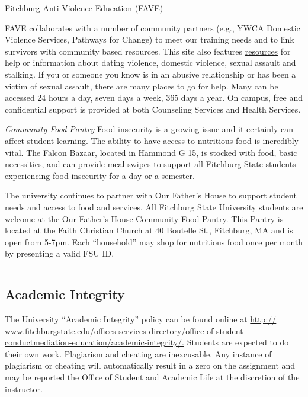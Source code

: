 \documentclass[
  letterpaper,
  DIV=11,
  numbers=noendperiod]{scrartcl}
\begin{document}
\href{http://www.google.com/url?q=http\%3A\%2F\%2Fwww.fitchburgstate.edu\%2Foffices-services-directory\%2Ffitchburg-anti-violence-education\%2F\&sa=D\&sntz=1\&usg=AFQjCNFi5qy-wunMxX-hoWbA9YwT8aa4Ig}{Fitchburg
Anti-Violence Education (FAVE)}

FAVE collaborates with a number of community partners (e.g., YWCA
Domestic Violence Services, Pathways for Change) to meet our training
needs and to link survivors with community based resources. This site
also features
\href{http://www.google.com/url?q=http\%3A\%2F\%2Fwww.fitchburgstate.edu\%2Foffices-services-directory\%2Ffitchburg-anti-violence-education\%2Ffitchburg-anti-violence-education-resources\%2F\&sa=D\&sntz=1\&usg=AFQjCNF9KZ2O1AvPMLJTHdNg1DfmYYtgog}{resources}
for help or information about dating violence, domestic violence, sexual
assault and stalking. If you or someone you know is in an abusive
relationship or has been a victim of sexual assault, there are many
places to go for help. Many can be accessed 24 hours a day, seven days a
week, 365 days a year. On campus, free and confidential support is
provided at both Counseling Services and Health Services.

\emph{Community Food Pantry} Food insecurity is a growing issue and it
certainly can affect student learning. The ability to have access to
nutritious food is incredibly vital. The Falcon Bazaar, located in
Hammond G 15, is stocked with food, basic necessities, and can provide
meal swipes to support all Fitchburg State students experiencing food
insecurity for a day or a semester.

The university continues to partner with Our Father's House to support
student needs and access to food and services. All Fitchburg State
University students are welcome at the Our Father's House Community Food
Pantry. This Pantry is located at the Faith Christian Church at 40
Boutelle St., Fitchburg, MA and is open from 5-7pm. Each ``household''
may shop for nutritious food once per month by presenting a valid FSU
ID.

\begin{center}\rule{0.5\linewidth}{0.5pt}\end{center}

\hypertarget{academic-integrity}{%
\subsection{Academic Integrity}\label{academic-integrity}}

The University ``Academic Integrity'' policy can be found online at
\href{http://www.fitchburgstate.edu/offices-services-directory/office-of-student-conduct-mediation-education/academic-integrity/}{http://
www.fitchburgstate.edu/offices-services-directory/office-of-student-conductmediation-education/academic-integrity/.}
Students are expected to do their own work. Plagiarism and cheating are
inexcusable. Any instance of plagiarism or cheating will automatically
result in a zero on the assignment and may be reported the Office of
Student and Academic Life at the discretion of the instructor.
\end{document}
